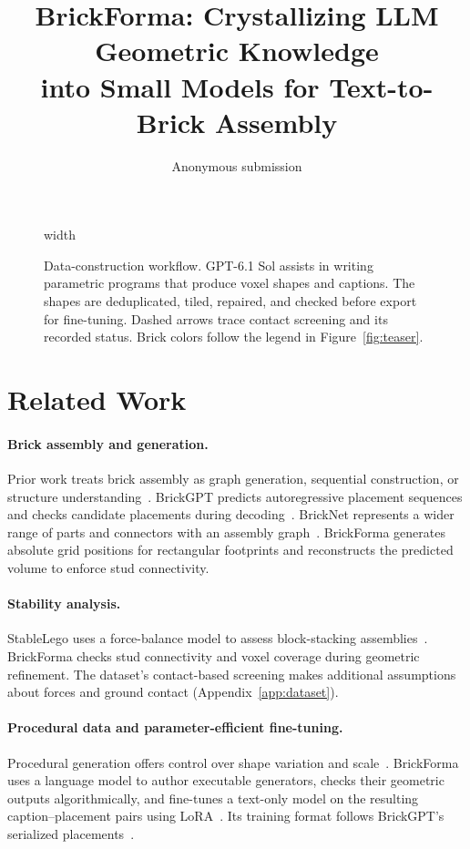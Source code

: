 \documentclass[letterpaper]{article} %
\title{BrickForma: Crystallizing LLM Geometric Knowledge\\into Small Models for Text-to-Brick Assembly}
\author{Anonymous submission}
\begin{document}
\maketitle




\begin{figure}[t]
\centering
\begingroup
\pdfximage width \textwidth {figure2.pdf}%
\pdfrefximage\pdflastximage\endgroup
\caption{Data-construction workflow. GPT-6.1 Sol assists in writing parametric programs that produce voxel shapes and captions. The shapes are deduplicated, tiled, repaired, and checked before export for fine-tuning. Dashed arrows trace contact screening and its recorded status. Brick colors follow the legend in Figure~\ref{fig:teaser}.}
\label{fig:data-workflow}
\end{figure}

\section{Related Work}
\paragraph{Brick assembly and generation.}
Prior work treats brick assembly as graph generation, sequential construction, or structure understanding~\cite{thompson2020lego,brickbybrick,breakandmake}. BrickGPT predicts autoregressive placement sequences and checks candidate placements during decoding~\cite{brickgpt}. BrickNet represents a wider range of parts and connectors with an assembly graph~\cite{bricknet}. BrickForma generates absolute grid positions for rectangular footprints and reconstructs the predicted volume to enforce stud connectivity.

\paragraph{Stability analysis.}
StableLego uses a force-balance model to assess block-stacking assemblies~\cite{stablelego}. BrickForma checks stud connectivity and voxel coverage during geometric refinement. The dataset's contact-based screening makes additional assumptions about forces and ground contact (Appendix~\ref{app:dataset}).

\paragraph{Procedural data and parameter-efficient fine-tuning.}
Procedural generation offers control over shape variation and scale~\cite{infinigen}. BrickForma uses a language model to author executable generators, checks their geometric outputs algorithmically, and fine-tunes a text-only model on the resulting caption--placement pairs using LoRA~\cite{lora}. Its training format follows BrickGPT's serialized placements~\cite{brickgpt}.
\end{document}
